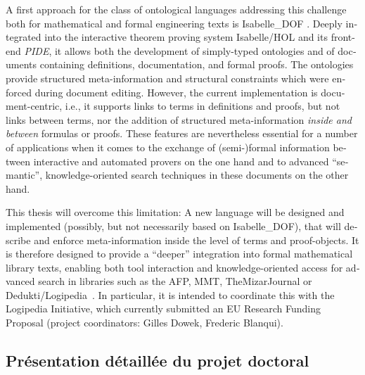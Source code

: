\documentclass[a4paper,10pt]{article}
\begin{document}
\begin{english}
A first approach for the class of ontological languages
addressing this challenge
both for mathematical and formal engineering texts is
Isabelle\_DOF
\cite{
  Brucker-ea.Using-CICM18,
  BruckerWolff.Design-SEFM19,
  BruckerWolff.Certif-IFM19%
}.
Deeply integrated into the interactive theorem proving system Isabelle/HOL
and its front-end \emph{PIDE},
it allows both the development of simply-typed ontologies
and of documents containing definitions, documentation,
and formal proofs.
The ontologies provide structured meta-information and structural constraints
which were enforced during document editing.
However, the current implementation is document-centric,
i.e., it supports links to terms in definitions and proofs,
but not links between terms, nor the addition of structured meta-information
\emph{inside and between} formulas or proofs.
These features are nevertheless essential for a number of applications
when it comes to the exchange of (semi-)formal information
between interactive and automated provers on the one hand
and to advanced \enquote{semantic}, knowledge-oriented search techniques
in these documents on the other hand.

This thesis will overcome this limitation:
A new language will be designed and implemented
(possibly, but not necessarily based on Isabelle\_DOF),
that will describe and enforce meta-information
inside the level of terms and proof-objects.
It is therefore designed to provide a \enquote{deeper} integration
into formal mathematical library texts,
enabling both tool interaction and knowledge-oriented access
for advanced search in libraries such as the AFP, MMT, TheMizarJournal
or Dedukti/Logipedia~\cite{afp,mmt,TheMizarJournal,dedukti}.
In particular, it is intended to coordinate this
with the Logipedia Initiative,
which currently submitted an EU Research Funding Proposal
(project coordinators: Gilles Dowek, Frederic Blanqui).

\end{english}

\subsection*{Présentation détaillée du projet doctoral}
\end{document}
